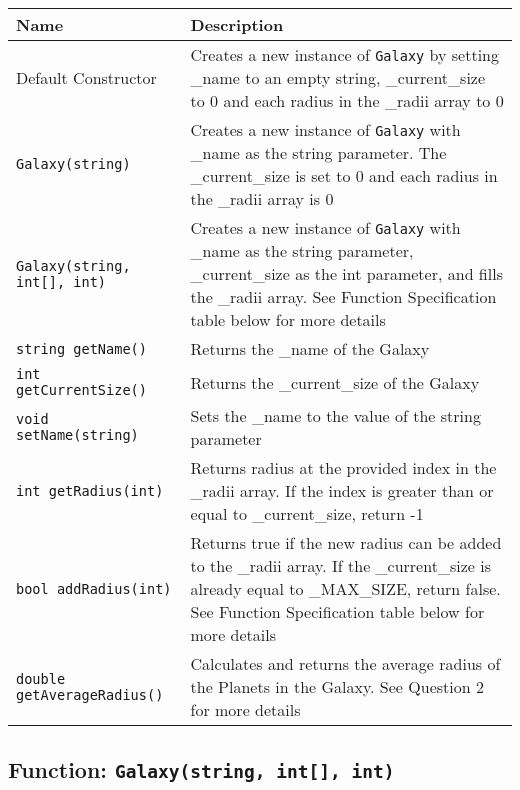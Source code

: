 \begin{table}[H]
    \centering
    \begin{tabular}{p{2in}|p{4in}}
        \textbf{Name} & \textbf{Description} \\ \hline
        Default Constructor & Creates a new instance of \texttt{Galaxy} by setting \_name to an empty string, \_current\_size to 0 and each radius in the \_radii array to 0 \\
        \texttt{Galaxy(string)} & Creates a new instance of \texttt{Galaxy} with \_name as the string parameter. The \_current\_size is set to 0 and each radius in the \_radii array is 0 \\
        \texttt{Galaxy(string, int[], int)} & Creates a new instance of \texttt{Galaxy} with \_name as the string parameter, \_current\_size as the int parameter, and fills the \_radii array. See Function Specification table below for more details \\
        \texttt{string getName()} & Returns the \_name of the Galaxy \\
        \texttt{int getCurrentSize()} & Returns the \_current\_size of the Galaxy \\
        \texttt{void setName(string)} & Sets the \_name to the value of the string parameter \\
        \texttt{int getRadius(int)} & Returns radius at the provided index in the \_radii array. If the index is greater than or equal to \_current\_size, return -1 \\
        \texttt{bool addRadius(int)} & Returns true if the new radius can be added to the \_radii array. If the \_current\_size is already equal to \_MAX\_SIZE, return false. See Function Specification table below for more details \\
        \texttt{double getAverageRadius()} & Calculates and returns the average radius of the Planets in the Galaxy. See Question 2 for more details \\
    \end{tabular}
\end{table}



\subsection*{Function: \texttt{Galaxy(string, int[], int)}}

